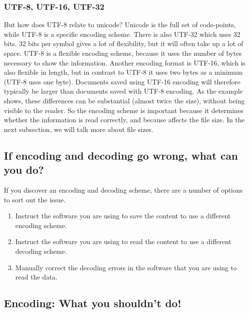 \documentclass[
]{book}
\providecommand{\tightlist}{%
  \setlength{\itemsep}{0pt}\setlength{\parskip}{0pt}}
\begin{document}
\hypertarget{utf-8-utf-16-utf-32}{%
\subsubsection{UTF-8, UTF-16, UTF-32}\label{utf-8-utf-16-utf-32}}

But how does UTF-8 relate to unicode? Unicode is the full set of code-points, while UTF-8 is a specific encoding scheme. There is also UTF-32 which uses 32 bits. 32 bits per symbol gives a lot of flexibility, but it will often take up a lot of space. UTF-8 is a flexible encoding scheme, because it uses the number of bytes necessary to show the information. Another encoding format is UTF-16, which is also flexible in length, but in contrast to UTF-8 it uses two bytes as a minimum (UTF-8 uses one byte). Documents saved using UTF-16 encoding will therefore typically be larger than documents saved with UTF-8 encoding. As the example shows, these differences can be substantial (almost twice the size), without being visible to the reader. So the encoding scheme is important because it determines whether the information is read correctly, and because affects the file size. In the next subsection, we will talk more about file sizes.

\hypertarget{if-encoding-and-decoding-go-wrong-what-can-you-do}{%
\subsection*{If encoding and decoding go wrong, what can you do?}\label{if-encoding-and-decoding-go-wrong-what-can-you-do}}

If you discover an encoding and decoding scheme, there are a number of options to sort out the issue.

\begin{enumerate}
\def\labelenumi{\arabic{enumi}.}
\tightlist
\item
  Instruct the software you are using to save the content to use a different encoding scheme.
\item
  Instruct the software you are using to read the content to use a different decoding scheme.
\item
  Manually correct the decoding errors in the software that you are using to read the data.
\end{enumerate}

\hypertarget{encoding-what-you-shouldnt-do}{%
\subsection{Encoding: What you shouldn't do!}\label{encoding-what-you-shouldnt-do}}
\end{document}
